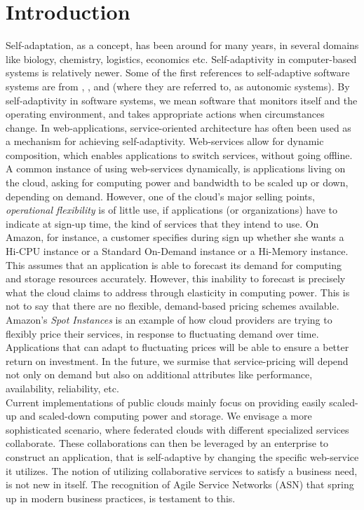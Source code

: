 \documentclass[10pt,journal,compsoc]{IEEEtran}
\begin{document}
\section{Introduction}
Self-adaptation, as a concept, has been around for many years, in several domains like biology, chemistry, logistics, economics etc. Self-adaptivity in computer-based systems is relatively newer. Some of the first references to self-adaptive software systems are from \cite{Oreizy1998Architecture-based}, \cite{Laddaga1999Creating}, \cite{Kokar1999Control} and \cite{Kephart2003Vision} (where they are referred to, as autonomic systems). By self-adaptivity in software systems, we mean software that monitors itself and the operating environment, and takes appropriate actions when circumstances change. In web-applications, service-oriented architecture has often been used as a mechanism for achieving self-adaptivity\cite{DiNitto2008journey}. Web-services allow for dynamic composition, which enables applications to switch services, without going offline. A common instance of using web-services dynamically, is applications living on the cloud, asking for computing power and bandwidth to be scaled up or down, depending on demand. However, one of the cloud's major selling points, \textit{operational flexibility} is of little use, if applications (or organizations) have to indicate at sign-up time, the kind of services that they intend to use. On Amazon, for instance, a customer specifies during sign up whether she wants a Hi-CPU instance or a Standard On-Demand instance or a Hi-Memory instance. This assumes that an application is able to forecast its demand for computing and storage resources accurately. However, this inability to forecast is precisely what the cloud claims to address through elasticity in computing power. This is not to say that there are no flexible, demand-based pricing schemes available. Amazon's \textit{Spot Instances} \cite{Amazon2010SpotInstance} is an example of how cloud providers are trying to flexibly price their services, in response to fluctuating demand over time. Applications that can adapt to fluctuating prices will be able to ensure a better return on investment. In the future, we surmise that service-pricing will depend not only on demand but also on additional attributes like performance, availability, reliability, etc.
\\ 
Current implementations of public clouds mainly focus on providing easily scaled-up and scaled-down computing power and storage. We envisage a more sophisticated scenario, where federated clouds with different specialized services collaborate. These collaborations can then be leveraged by an enterprise to construct an application, that is self-adaptive by changing the specific web-service it utilizes. The notion of utilizing collaborative services to satisfy a business need, is not new in itself. The recognition of Agile Service Networks (ASN) that spring up in modern business practices, is testament to this. 
\end{document}
